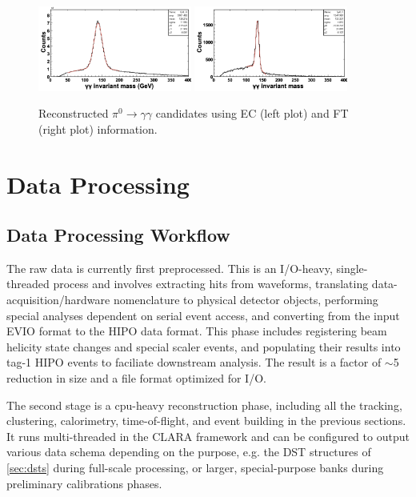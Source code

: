 \documentclass[3p,times,twocolumn]{elsarticle}
\begin{document}
\begin{figure}
\includegraphics[width=0.45\textwidth]{pics/pi0mass.png}
\includegraphics[width=0.45\textwidth]{pics/pi0mass2.png}
\caption{Reconstructed $\pi^{0}\rightarrow \gamma \gamma$ candidates using EC (left plot) and FT (right plot) information.
}
\label{fig:pi0mass}
\end{figure}


\section{Data Processing}

\subsection{Data Processing Workflow}
The raw data is currently first preprocessed.  This is an I/O-heavy, single-threaded process and involves extracting hits from waveforms, translating data-acquisition/hardware nomenclature to physical detector objects, performing special analyses dependent on serial event access, and converting from the input EVIO format to the HIPO data format.  This phase includes registering beam helicity state changes and special scaler events, and populating their results into tag-1 HIPO events to faciliate downstream analysis.  The result is a factor of $\sim$5 reduction in size and a file format optimized for I/O.

The second stage is a cpu-heavy reconstruction phase, including all the tracking, clustering, calorimetry, time-of-flight, and event building in the previous sections.  It runs multi-threaded in the CLARA framework and can be configured to output various data schema depending on the purpose, e.g. the DST structures of \ref{sec:dsts} during full-scale processing, or larger, special-purpose banks during preliminary calibrations phases.
\end{document}

